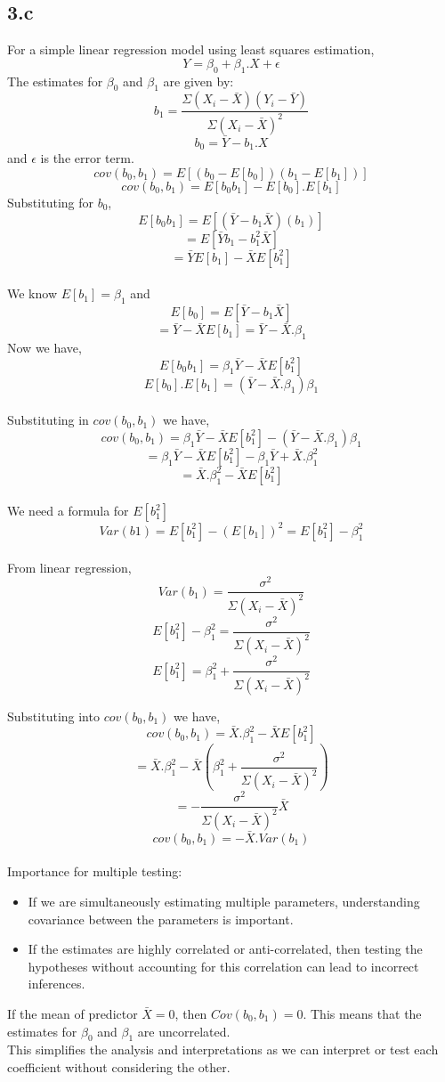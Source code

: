 \documentclass[12pt]{article}
\begin{document}
\subsection*{3.c}
For a simple linear regression model using least squares estimation,
\[Y = \beta_0 + \beta_1 . X + \epsilon\]
The estimates for \(\beta_0\) and \(\beta_1\) are given by:
\[b_1 = \frac{\Sigma(X_i - \bar{X})(Y_i - \bar{Y})}{\Sigma(X_i - \bar{X})^2}\]
\[b_0 = \bar{Y} - b_1.X\]
and \(\epsilon\) is the error term.
\\[\baselineskip]
\[cov(b_0, b_1) = E[(b_0 - E[b_0])(b_1 - E[b_1])]\]
\[cov(b_0, b_1) = E[b_0b_1] - E[b_0].E[b_1]\]
Substituting for \(b_0\),
\[E[b_0 b_1] = E[(\bar{Y} - b_1 \bar{X})(b_1)]\]
\[= E[\bar{Y}b_1 - b_1^2 \bar{X}]\]
\[= \bar{Y} E[b_1] - \bar{X} E[b_1^2]\]
\\
We know \(E[b_1] = \beta_1\) and
\[E[b_0] = E[\bar{Y} - b_1 \bar{X}]\]
\[= \bar{Y} - \bar{X}E[b_1] = \bar{Y} - \bar{X}.\beta_1\]
Now we have,
\[E[b_0 b_1] = \beta_1\bar{Y} - \bar{X} E[b_1^2]\]
\[E[b_0].E[b_1] = (\bar{Y} - \bar{X}.\beta_1)\beta_1\]
\\
Substituting in \(cov(b_0, b_1)\) we have,
\[cov(b_0, b_1) = \beta_1\bar{Y} - \bar{X} E[b_1^2] - (\bar{Y} - \bar{X}.\beta_1)\beta_1\]
\[= \beta_1\bar{Y} - \bar{X} E[b_1^2] - \beta_1\bar{Y} + \bar{X}.\beta_1^2\]
\[= \bar{X}.\beta_1^2 - \bar{X} E[b_1^2]\]
\\
We need a formula for \(E[b_1^2]\)
\[Var(b1) = E[b_1^2] - (E[b_1])^2 = E[b_1^2] - \beta_1^2\]
\\From linear regression,
\[Var(b_1) = \frac{\sigma^2}{\Sigma(X_i - \bar{X})^2}\]
\[E[b_1^2] - \beta_1^2 = \frac{\sigma^2}{\Sigma(X_i - \bar{X})^2}\]
\[E[b_1^2] = \beta_1^2 + \frac{\sigma^2}{\Sigma(X_i - \bar{X})^2}\]

\newpage
Substituting into \(cov(b_0, b_1)\) we have,
\[cov(b_0, b_1) = \bar{X}.\beta_1^2 - \bar{X} E[b_1^2]\]
\[=\bar{X}.\beta_1^2 - \bar{X} (\beta_1^2 + \frac{\sigma^2}{\Sigma(X_i - \bar{X})^2})\]
\[= - \frac{\sigma^2}{\Sigma(X_i - \bar{X})^2}\bar{X}\]
\[cov(b_0, b_1) = -\bar{X}.Var(b_1)\]
\\[\baselineskip]
Importance for multiple testing:
\begin{itemize}
    \item If we are simultaneously estimating multiple parameters, understanding
    covariance between the parameters is important.
    \item If the estimates are highly correlated or anti-correlated, then testing
    the hypotheses without accounting for this correlation can lead to incorrect
    inferences.
\end{itemize}
If the mean of predictor \(\bar{X} = 0\), then \(Cov(b_0, b_1) = 0\).
This means that the estimates for \(\beta_0\) and \(\beta_1\) are uncorrelated.
\\
This simplifies the analysis and interpretations as we can interpret or test
each coefficient without considering the other.
\newpage
\end{document}
